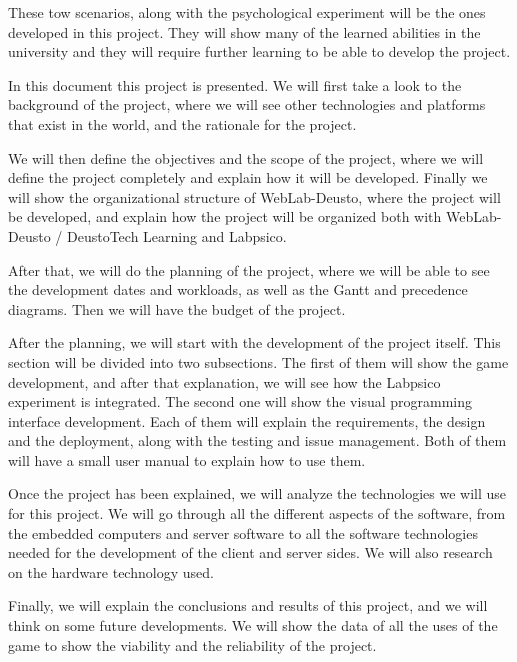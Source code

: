 These tow scenarios, along with the psychological experiment will be the ones developed in this
project. They will show many of the learned abilities in the university and they will require
further learning to be able to develop the project.

In this document this project is presented. We will first take a look to the background of the
project, where we will see other technologies and platforms that exist in the world, and the
rationale for the project.

We will then define the objectives and the scope of the project, where we will define the project
completely and explain how it will be developed. Finally we will show the organizational structure
of WebLab-Deusto, where the project will be developed, and explain how the project will be organized
both with WebLab-Deusto / DeustoTech Learning and Labpsico.

After that, we will do the planning of the project, where we will be able to see the development
dates and workloads, as well as the Gantt and precedence diagrams. Then we will have the budget of
the project.

After the planning, we will start with the development of the project itself. This section will be
divided into two subsections. The first of them will show the game development, and after that
explanation, we will see how the Labpsico experiment is integrated. The second one will show the
visual programming interface development. Each of them will explain the requirements, the design and
the deployment, along with the testing and issue management. Both of them will have a small user
manual to explain how to use them.

Once the project has been explained, we will analyze the technologies we will use for this project.
We will go through all the different aspects of the software, from the embedded computers and server
software to all the software technologies needed for the development of the client and server sides.
We will also research on the hardware technology used.

Finally, we will explain the conclusions and results of this project, and we will think on some
future developments. We will show the data of all the uses of the game to show the viability and the
reliability of the project.
